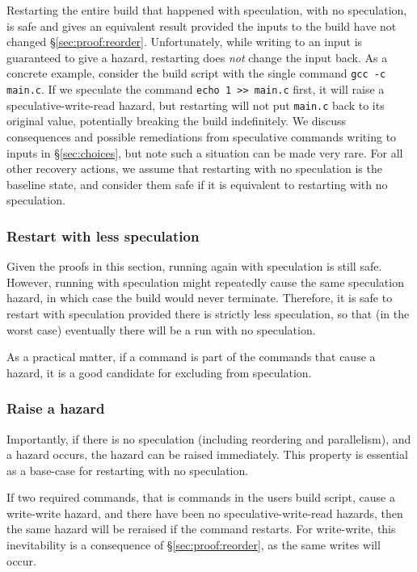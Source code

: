 Restarting the entire build that happened with speculation, with no speculation, is safe and gives an equivalent result provided the inputs to the build have not changed \S\ref{sec:proof:reorder}. Unfortunately, while writing to an input is guaranteed to give a hazard, restarting does \emph{not} change the input back. As a concrete example, consider the build script with the single command \texttt{gcc -c main.c}. If we speculate the command \texttt{echo 1 >> main.c} first, it will raise a speculative-write-read hazard, but restarting will not put \texttt{main.c} back to its original value, potentially breaking the build indefinitely. We discuss consequences and possible remediations from speculative commands writing to inputs in \S\ref{sec:choices}, but note such a situation can be made very rare. For all other recovery actions, we assume that restarting with no speculation is the baseline state, and consider them safe if it is equivalent to restarting with no speculation.

\subsubsection{Restart with less speculation}

Given the proofs in this section, running again with speculation is still safe. However, running with speculation might repeatedly cause the same speculation hazard, in which case the build would never terminate. Therefore, it is safe to restart with speculation provided there is strictly less speculation, so that (in the worst case) eventually there will be a run with no speculation.

As a practical matter, if a command is part of the commands that cause a hazard, it is a good candidate for excluding from speculation.

\subsubsection{Raise a hazard}

Importantly, if there is no speculation (including reordering and parallelism), and a hazard occurs, the hazard can be raised immediately. This property is essential as a base-case for restarting with no speculation.

If two required commands, that is commands in the users build script, cause a write-write hazard, and there have been no speculative-write-read hazards, then the same hazard will be reraised if the command restarts. For write-write, this inevitability is a consequence of \S\ref{sec:proof:reorder}, as the same writes will occur.

